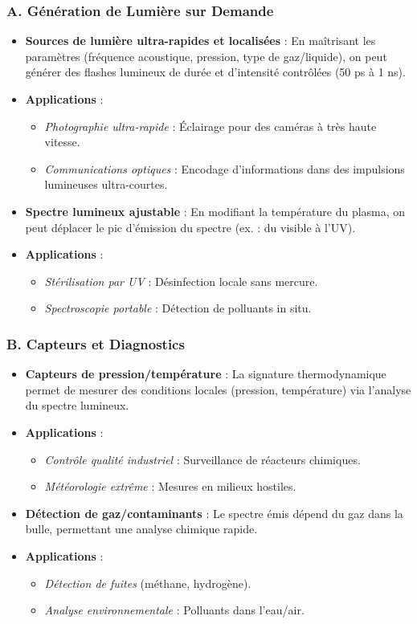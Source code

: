 \documentclass[a4paper,12pt]{article}
\begin{document}
\subsubsection*{A. Génération de Lumière sur Demande}
\begin{itemize}
    \item \textbf{Sources de lumière ultra-rapides et localisées} : En maîtrisant les paramètres (fréquence acoustique, pression, type de gaz/liquide), on peut générer des flashes lumineux de durée et d’intensité contrôlées (50 ps à 1 ns).
    \item \textbf{Applications} :
    \begin{itemize}
        \item \textit{Photographie ultra-rapide} : Éclairage pour des caméras à très haute vitesse.
        \item \textit{Communications optiques} : Encodage d’informations dans des impulsions lumineuses ultra-courtes.
    \end{itemize}
    \item \textbf{Spectre lumineux ajustable} : En modifiant la température du plasma, on peut déplacer le pic d’émission du spectre (ex. : du visible à l’UV).
    \item \textbf{Applications} :
    \begin{itemize}
        \item \textit{Stérilisation par UV} : Désinfection locale sans mercure.
        \item \textit{Spectroscopie portable} : Détection de polluants in situ.
    \end{itemize}
\end{itemize}

\subsubsection*{B. Capteurs et Diagnostics}
\begin{itemize}
    \item \textbf{Capteurs de pression/température} : La signature thermodynamique permet de mesurer des conditions locales (pression, température) via l’analyse du spectre lumineux.
    \item \textbf{Applications} :
    \begin{itemize}
        \item \textit{Contrôle qualité industriel} : Surveillance de réacteurs chimiques.
        \item \textit{Météorologie extrême} : Mesures en milieux hostiles.
    \end{itemize}
    \item \textbf{Détection de gaz/contaminants} : Le spectre émis dépend du gaz dans la bulle, permettant une analyse chimique rapide.
    \item \textbf{Applications} :
    \begin{itemize}
        \item \textit{Détection de fuites} (méthane, hydrogène).
        \item \textit{Analyse environnementale} : Polluants dans l’eau/air.
    \end{itemize}
\end{itemize}
\end{document}
